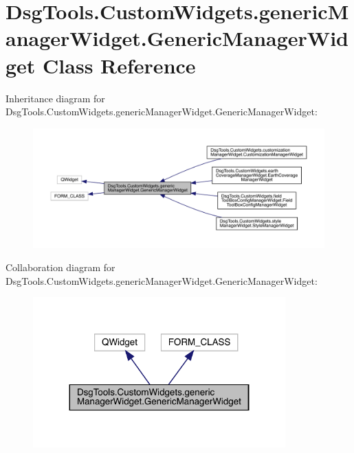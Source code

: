 \hypertarget{class_dsg_tools_1_1_custom_widgets_1_1generic_manager_widget_1_1_generic_manager_widget}{}\section{Dsg\+Tools.\+Custom\+Widgets.\+generic\+Manager\+Widget.\+Generic\+Manager\+Widget Class Reference}
\label{class_dsg_tools_1_1_custom_widgets_1_1generic_manager_widget_1_1_generic_manager_widget}


Inheritance diagram for Dsg\+Tools.\+Custom\+Widgets.\+generic\+Manager\+Widget.\+Generic\+Manager\+Widget\+:
\nopagebreak
\begin{figure}[H]
\begin{center}
\leavevmode
\includegraphics[width=350pt]{class_dsg_tools_1_1_custom_widgets_1_1generic_manager_widget_1_1_generic_manager_widget__inherit__graph}
\end{center}
\end{figure}


Collaboration diagram for Dsg\+Tools.\+Custom\+Widgets.\+generic\+Manager\+Widget.\+Generic\+Manager\+Widget\+:
\nopagebreak
\begin{figure}[H]
\begin{center}
\leavevmode
\includegraphics[width=275pt]{class_dsg_tools_1_1_custom_widgets_1_1generic_manager_widget_1_1_generic_manager_widget__coll__graph}
\end{center}
\end{figure}
